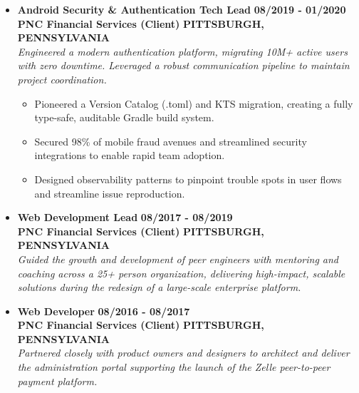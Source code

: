 \documentclass[10pt,letterpaper]{article}
\begin{document}
\begin{itemize}[label={}, leftmargin=0pt, itemsep=6pt, parsep=0pt]
\item{
\textbf{\ttfamily\normalsize Android Security \& Authentication Tech Lead} \hfill \textbf{\ttfamily\normalsize\color{color1} 08/2019 - 01/2020}\\
\textbf{\ttfamily\small\color{color1} PNC Financial Services (Client)} \hfill \textbf{\ttfamily\small\color{color1} PITTSBURGH, PENNSYLVANIA}\vspace{2pt}\\
{\itshape\sffamily Engineered a modern authentication platform, migrating 10M+ active users with zero downtime. Leveraged a robust communication pipeline to maintain project coordination.}\vspace{2pt}
\begin{itemize}[label=\textbullet, leftmargin=15pt, itemsep=1pt, parsep=0pt]
    \item {\sffamily Pioneered a Version Catalog (.toml) and KTS migration, creating a fully type-safe, auditable Gradle build system.}
    \item {\sffamily Secured 98\% of mobile fraud avenues and streamlined security integrations to enable rapid team adoption.}
    \item {\sffamily Designed observability patterns to pinpoint trouble spots in user flows and streamline issue reproduction.}
\end{itemize}
}

\item{
\textbf{\ttfamily\normalsize Web Development Lead} \hfill \textbf{\ttfamily\normalsize\color{color1} 08/2017 - 08/2019}\\
\textbf{\ttfamily\small\color{color1} PNC Financial Services (Client)} \hfill \textbf{\ttfamily\small\color{color1} PITTSBURGH, PENNSYLVANIA}\vspace{2pt}\\
{\itshape\sffamily Guided the growth and development of peer engineers with mentoring and coaching across a 25+ person organization, delivering high-impact, scalable solutions during the redesign of a large-scale enterprise platform.}
}

\item{
\textbf{\ttfamily\normalsize Web Developer} \hfill \textbf{\ttfamily\normalsize\color{color1} 08/2016 - 08/2017}\\
\textbf{\ttfamily\small\color{color1} PNC Financial Services (Client)} \hfill \textbf{\ttfamily\small\color{color1} PITTSBURGH, PENNSYLVANIA}\vspace{2pt}\\
{\itshape\sffamily Partnered closely with product owners and designers to architect and deliver the administration portal supporting the launch of the Zelle peer-to-peer payment platform.}
}


\end{itemize}
\end{document}
